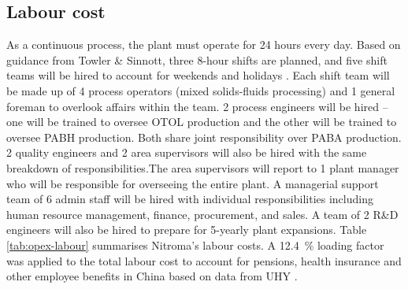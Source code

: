 \subsection{Labour cost}
As a continuous process, the plant must operate for 24 hours every day. Based on guidance from Towler \& Sinnott, three 8-hour shifts are planned, and five shift teams will be hired to account for weekends and holidays \cite{sinnott_chemical_2020}. Each shift team will be made up of 4 process operators (mixed solids-fluids processing) and 1 general foreman to overlook affairs within the team. 2 process engineers will be hired – one will be trained to oversee OTOL production and the other will be trained to oversee PABH production. Both share joint responsibility over PABA production. 2 quality engineers and 2 area supervisors will also be hired with the same breakdown of responsibilities.The area supervisors will report to 1 plant manager who will be responsible for overseeing the entire plant. A managerial support team of 6 admin staff will be hired with individual responsibilities including human resource management, finance, procurement, and sales. A team of 2 R\&D engineers will also be hired to prepare for 5-yearly plant expansions.
Table \ref{tab:opex-labour} summarises Nitroma's labour costs. A \SI{12.4}{\percent} loading factor was applied to the total labour cost to account for pensions, health insurance and other employee benefits in China based on data from UHY \cite{uhy_employers_2021}.

